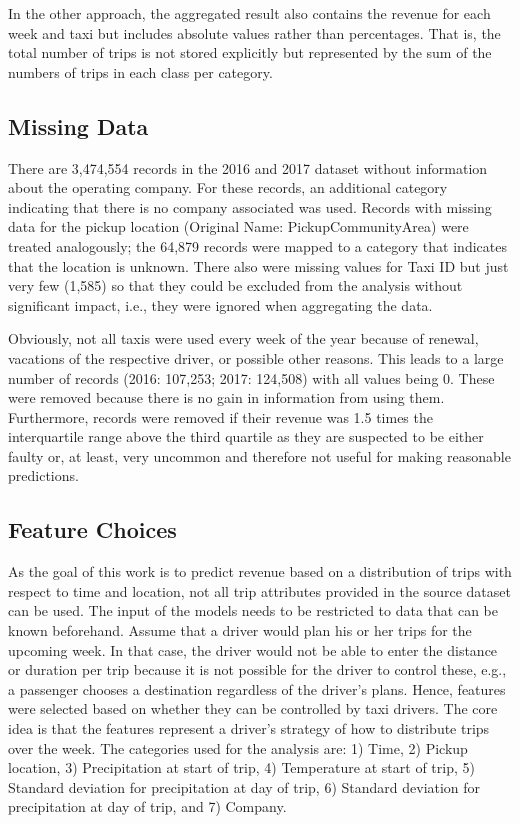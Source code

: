\documentclass[twoside,11pt]{article}
\begin{document}
In the other approach, the aggregated result also contains the revenue for each week and taxi but includes absolute values rather than percentages. That is, the total number of trips is not stored explicitly but represented by the sum of the numbers of trips in each class per category.\par

\subsection{Missing Data}

There are 3,474,554 records in the 2016 and 2017 dataset without information about the operating company. For these records, an additional category indicating that there is no company associated was used. Records with missing data for the pickup location (Original Name: PickupCommunityArea) were treated analogously; the 64,879 records were mapped to a category that indicates that the location is unknown. There also were missing values for Taxi ID but just very few (1,585) so that they could be excluded from the analysis without significant impact, i.e., they were ignored when aggregating the data.\par

Obviously, not all taxis were used every week of the year because of renewal, vacations of the respective driver, or possible other reasons. This leads to a large number of records (2016: 107,253; 2017: 124,508) with all values being 0. These were removed because there is no gain in information from using them. Furthermore, records were removed if their revenue was 1.5 times the interquartile range above the third quartile as they are suspected to be either faulty or, at least, very uncommon and therefore not useful for making reasonable predictions.\par

\subsection{Feature Choices} 

As the goal of this work is to predict revenue based on a distribution of trips with respect to time and location, not all trip attributes provided in the source dataset can be used. The input of the models needs to be restricted to data that can be known beforehand. Assume that a driver would plan his or her trips for the upcoming week. In that case, the driver would not be able to enter the distance or duration per trip because it is not possible for the driver to control these, e.g., a passenger chooses a destination regardless of the driver's plans. Hence, features were selected based on whether they can be controlled by taxi drivers. The core idea is that the features represent a driver's strategy of how to distribute trips over the week. The categories used for the analysis are: 1) Time, 2) Pickup location, 3) Precipitation at start of trip, 4) Temperature at start of trip, 5) Standard deviation for precipitation at day of trip, 6) Standard deviation for precipitation at day of trip, and 7) Company.
\end{document}
